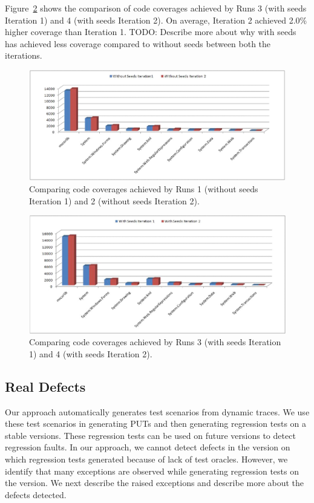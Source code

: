 Figure~\ref{fig:rq42} shows the comparison of code coverages achieved by Runs 3 (with seeds Iteration 1)
and 4 (with seeds Iteration 2). On average, Iteration 2 achieved 2.0\% higher coverage than
Iteration 1. TODO: Describe more about why with seeds has achieved less coverage compared to
without seeds between both the iterations.

\begin{figure}[t]
\centering
\includegraphics[scale=0.70,clip]{figs/RQ4_1_1.eps}\vspace*{-1ex}
\caption{Comparing code coverages achieved by Runs 1 (without seeds Iteration 1) and 2 (without seeds Iteration 2).} \label{fig:rq41}
\end{figure}


\begin{figure}[t]
\centering
\includegraphics[scale=0.70,clip]{figs/RQ4_2_1.eps}\vspace*{-1ex}
\caption{Comparing code coverages achieved by Runs 3 (with seeds Iteration 1) and 4 (with seeds Iteration 2).} \label{fig:rq42}
\end{figure}

\subsection{Real Defects}

Our approach automatically generates test scenarios from dynamic traces. We use these test scenarios
in generating PUTs and then generating regression tests on a stable versions. These regression tests
can be used on future versions to detect regression faults. In our approach, we cannot detect
defects in the version on which regression tests generated because of lack of test oracles. However,
we identify that many exceptions are observed while generating regression tests on the version.
We next describe the raised exceptions and describe more about the defects detected.